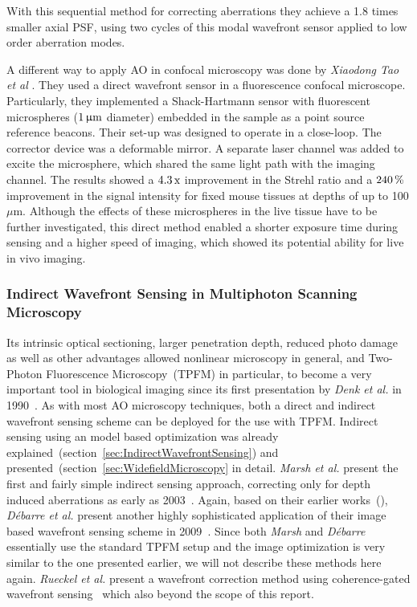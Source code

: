 With this sequential method for correcting aberrations they achieve a 1.8 times smaller axial PSF, using two cycles of this modal wavefront sensor applied to low order aberration modes.

A different way to apply AO in confocal microscopy was done by \textit{Xiaodong Tao et al} \cite{scan_Confocal_direct_sensing}. They used a direct wavefront sensor in a fluorescence confocal microscope. Particularly, they implemented a Shack-Hartmann sensor with fluorescent microspheres ($\unit[1]{\upmu m}$ diameter) embedded in the sample as a point source reference beacons. Their set-up was designed to operate in a close-loop. The corrector device was a deformable mirror. A separate laser channel was added to excite the microsphere, which shared the same light path with the imaging channel. The results showed a $\unit[4.3]{\text{x}}$ improvement in the Strehl ratio and a $\unit[240]{\%}$ improvement in the signal intensity for fixed mouse tissues at depths of up to 100 $\mu$m. Although the effects of these microspheres in the live tissue have to be further investigated, this direct method enabled a shorter exposure time during sensing and a higher speed of imaging, which showed its potential ability for live in vivo imaging.


\subsubsection{Indirect Wavefront Sensing in Multiphoton Scanning Microscopy}
\label{sec:MultiphotonScanningMicroscopyUsingIndirektSensing}

Its intrinsic optical sectioning, larger penetration depth, reduced photo damage as well as other advantages allowed nonlinear microscopy in general, and Two-Photon Fluorescence Microscopy~(TPFM) in particular, to become a very important tool in biological imaging since its first presentation by \emph{Denk et al.} in 1990~\cite{scan_TPFM_principle}. As with most AO microscopy techniques, both a direct and indirect wavefront sensing scheme can be deployed for the use with TPFM. Indirect sensing using an model based optimization was already explained~(section~\ref{sec:IndirectWavefrontSensing}) and presented~(section~\ref{sec:WidefieldMicroscopy} in detail. \emph{Marsh et al.} present the first and fairly simple indirect sensing approach, correcting only for depth induced aberrations as early as 2003~\cite{scan_TPFM_pratical}. Again, based on their earlier works~(\cite{wide_AOM_loew_freq,wide_AOM_structured_illu}), \emph{D\'{e}barre et al.} present another highly sophisticated application of their image based wavefront sensing scheme in 2009~\cite{scan_TPFM_image_based}. Since both \emph{Marsh} and \emph{D\'{e}barre} essentially use the standard TPFM setup and the image optimization is very similar to the one presented earlier, we will not describe these methods here again. \emph{Rueckel et al.} present a wavefront correction method using coherence-gated wavefront sensing~\cite{scan_TPFM_gated_wavefront} which also beyond the scope of this report. 

